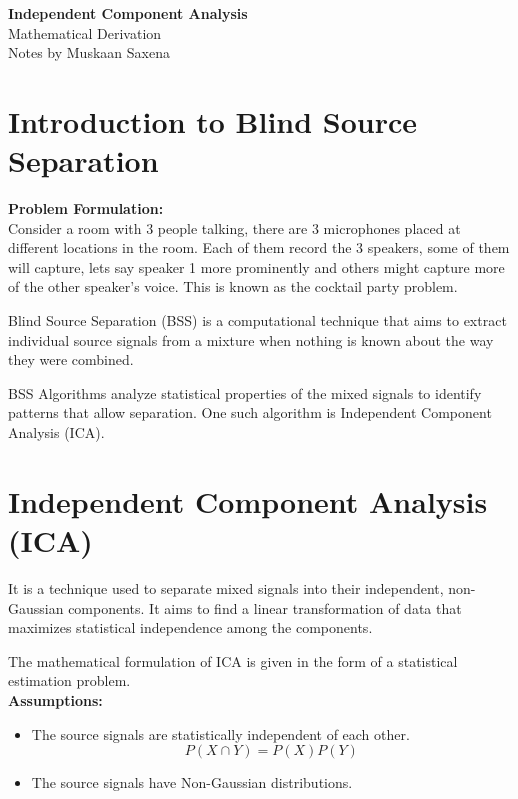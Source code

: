 \documentclass[12pt]{article}
\numberwithin{equation}{section}
\begin{document}
\begin{center}
    {\LARGE \textbf{Independent Component Analysis}}\\[4pt]
    {\large Mathematical Derivation}\\
    {\small Notes by Muskaan Saxena}
\end{center}
\vspace{10pt}

\section*{Introduction to Blind Source Separation}

\textbf{Problem Formulation:} \\
Consider a room with 3 people talking, there are 3 microphones placed at different locations in the room. Each of them record the 3 speakers, some of them will capture, lets say speaker 1 more prominently and others might capture more of the other speaker's voice. This is known as the cocktail party problem.

Blind Source Separation (BSS) is a computational technique that aims to extract individual source signals from a mixture when nothing is known about the way they were combined.

BSS Algorithms analyze statistical properties of the mixed signals to identify patterns that allow separation. One such algorithm is Independent Component Analysis (ICA).

\section*{Independent Component Analysis (ICA)} 

It is a technique used to separate mixed signals into their independent, non-Gaussian components. It aims to find a linear transformation of data that maximizes statistical independence among the components.

The mathematical formulation of ICA is given in the form of a statistical estimation problem. \\

\textbf{Assumptions:}
\begin{itemize}
    \item The source signals are statistically independent of each other.
     \[
     P(X \cap Y) = P(X) P(Y)
     \]
     \item The source signals have Non-Gaussian distributions.
\end{itemize}
\end{document}
